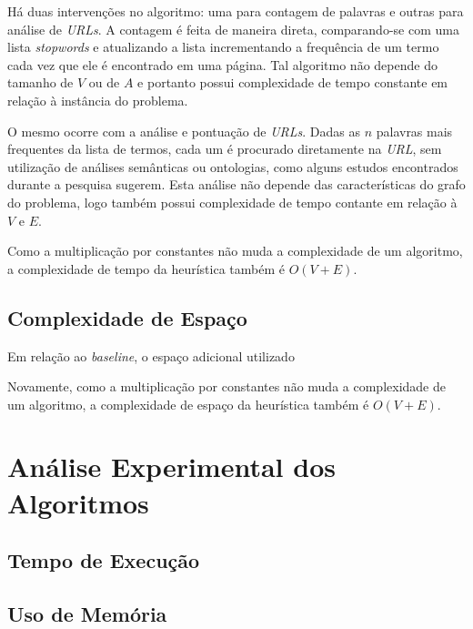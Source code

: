 \documentclass[a4paper,12pt,titlepage]{article}
\begin{document}
Há duas intervenções no algoritmo: uma para contagem de palavras e outras para análise de \textit{URLs}. A contagem é feita de maneira direta, comparando-se com uma lista \textit{stopwords} e atualizando a lista incrementando a frequência de um termo cada vez que ele é encontrado em uma página. Tal algoritmo não depende do tamanho de $V$ ou de $A$ e portanto possui complexidade de tempo constante em relação à instância do problema. 

O mesmo ocorre com a análise e pontuação de \textit{URLs}. Dadas as $n$ palavras mais frequentes da lista de termos, cada um é procurado diretamente na \textit{URL}, sem utilização de análises semânticas ou ontologias, como alguns estudos encontrados durante a pesquisa sugerem. Esta análise não depende das características do grafo do problema, logo também possui complexidade de tempo contante em relação à $V$ e $E$.

Como a multiplicação por constantes não muda a complexidade de um algoritmo, a complexidade de tempo da heurística também é $O(V+E)$.

\subsection{Complexidade de Espaço}

Em relação ao \textit{baseline}, o espaço adicional utilizado

Novamente, como a multiplicação por constantes não muda a complexidade de um algoritmo, a complexidade de espaço da heurística também é $O(V+E)$.

\section{Análise Experimental dos Algoritmos}

\subsection{Tempo de Execução}

\subsection{Uso de Memória}
\end{document}
